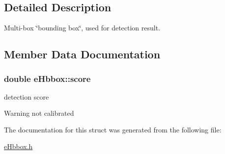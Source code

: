 \subsection{Detailed Description}
Multi-\/box \char`\"{}bounding box\char`\"{}, used for detection result. 

\subsection{Member Data Documentation}
\hypertarget{structeHbbox_a90d1b31a19d0facdeb4caaaba11af54d}{
\subsubsection[{score}]{\setlength{\rightskip}{0pt plus 5cm}double e\-Hbbox\-::score}}\label{structeHbbox_a90d1b31a19d0facdeb4caaaba11af54d}


detection score 

\begin{DoxyWarning}{Warning}
not calibrated 
\end{DoxyWarning}


The documentation for this struct was generated from the following file\-:\begin{DoxyCompactItemize}
\item 
\hyperlink{eHbbox_8h}{e\-Hbbox.\-h}\end{DoxyCompactItemize}
